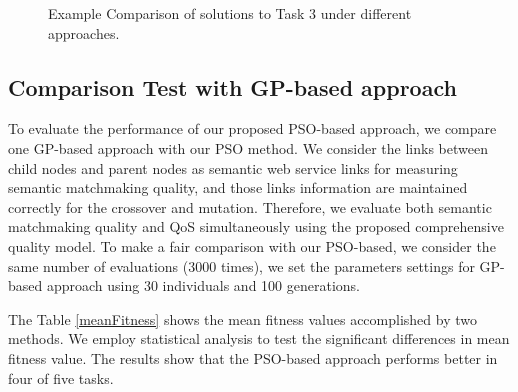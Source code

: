 \documentclass{IEEEtran}
\begin{document}
\begin{figure}[h]
 \caption{Example Comparison of solutions to Task 3 under different approaches.}
 \label{comparisontest}
\end{figure}

\subsection{Comparison Test with GP-based approach}\label{comparisonTestWithGP}
To evaluate the performance of our proposed PSO-based approach, we compare one GP-based approach  \cite{ma2015hybrid} with our PSO method. We consider the links between child nodes and parent nodes as semantic web service links for measuring  semantic matchmaking quality, and those links information are maintained correctly for the crossover and mutation. Therefore, we evaluate both semantic matchmaking quality and QoS simultaneously using the proposed comprehensive quality model. To make a fair comparison with our PSO-based, we consider the same number of evaluations (3000 times), we set the parameters settings for GP-based approach \cite{ma2015hybrid} using 30 individuals and 100 generations.

The Table \ref{meanFitness} shows the mean fitness values accomplished by two methods. We employ statistical analysis to test the significant differences in mean fitness value.  The results show that the PSO-based approach performs better in four of five tasks.
\end{document}
